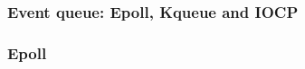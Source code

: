 \begin{frame}[fragile]
    \frametitle{Event queue: Epoll, Kqueue and IOCP}
% 
% 
% 
% 
\end{frame}
\begin{frame}[fragile]
    \frametitle{Epoll}
% 
% 
% 
\end{frame}
